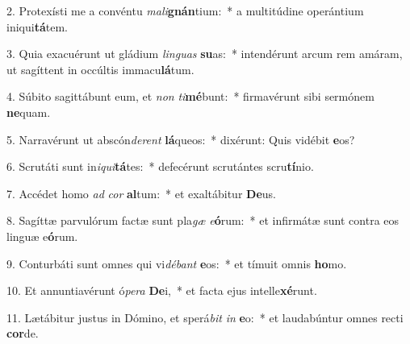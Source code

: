 2. Protexísti me a convéntu \textit{ma}\textit{li}\textbf{gnán}tium:~*  a multitúdine operántium iniqui\textbf{tá}tem.\

3. Quia exacuérunt ut gládium \textit{lin}\textit{guas} \textbf{su}as:~*  intendérunt arcum rem amáram, ut sagíttent in occúltis immacu\textbf{lá}tum.\

4. Súbito sagittábunt eum, et \textit{non} \textit{ti}\textbf{mé}bunt:~*  firmavérunt sibi sermónem \textbf{ne}quam.\

5. Narravérunt ut abscón\textit{de}\textit{rent} \textbf{lá}queos:~*  dixérunt: Quis vidébit \textbf{e}os?\

6. Scrutáti sunt in\textit{i}\textit{qui}\textbf{tá}tes:~*  defecérunt scrutántes scru\textbf{tí}nio.\

7. Accédet homo \textit{ad} \textit{cor} \textbf{al}tum:~*  et exaltábitur \textbf{De}us.\

8. Sagíttæ parvulórum factæ sunt pla\textit{gæ} \textit{e}\textbf{ó}rum:~*  et infirmátæ sunt contra eos linguæ e\textbf{ó}rum.\

9. Conturbáti sunt omnes qui vi\textit{dé}\textit{bant} \textbf{e}os:~*  et tímuit omnis \textbf{ho}mo.\

10. Et annuntiavérunt ó\textit{pe}\textit{ra} \textbf{De}i,~*  et facta ejus intelle\textbf{xé}runt.\

11. Lætábitur justus in Dómino, et sperá\textit{bit} \textit{in} \textbf{e}o:~*  et laudabúntur omnes recti \textbf{cor}de.\


